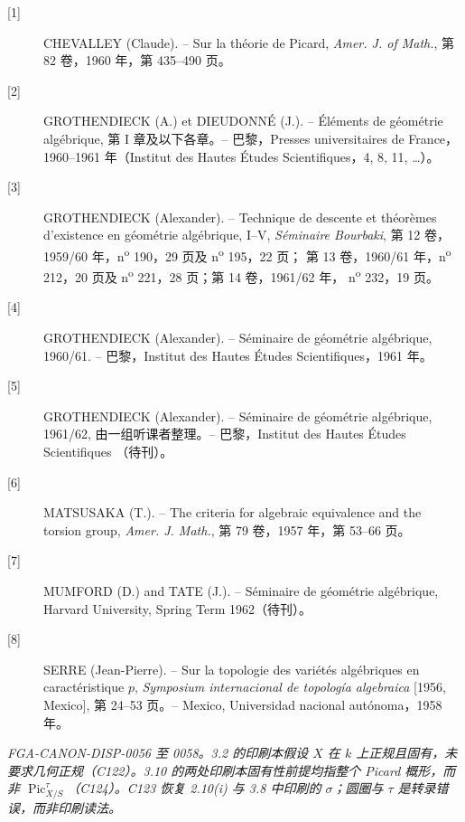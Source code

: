 \documentclass[12pt,twoside,openany]{book}
\numberwithin{equation}{section}
\theoremstyle{plain}
\theoremstyle{definition}
\theoremstyle{remark}
\begin{document}
\begin{description}
\item[{[1]}] CHEVALLEY (Claude). -- Sur la théorie de Picard,
\emph{Amer. J. of Math.}, 第 82 卷，1960 年，第 435--490 页。

\item[{[2]}] GROTHENDIECK (A.) et DIEUDONNÉ (J.). -- Éléments de géométrie
algébrique, 第 I 章及以下各章。-- 巴黎，Presses universitaires de France，
1960--1961 年（Institut des Hautes Études Scientifiques，4, 8, 11,
\ldots）。

\item[{[3]}] GROTHENDIECK (Alexander). -- Technique de descente et théorèmes
d'existence en géométrie algébrique, I--V, \emph{Séminaire Bourbaki}, 第 12 卷，
1959/60 年，n\textsuperscript{o} 190，29 页及 n\textsuperscript{o} 195，22 页；
第 13 卷，1960/61 年，n\textsuperscript{o} 212，20 页及
n\textsuperscript{o} 221，28 页；第 14 卷，1961/62 年，
n\textsuperscript{o} 232，19 页。

\item[{[4]}] GROTHENDIECK (Alexander). -- Séminaire de géométrie algébrique,
1960/61. -- 巴黎，Institut des Hautes Études Scientifiques，1961 年。

\item[{[5]}] GROTHENDIECK (Alexander). -- Séminaire de géométrie algébrique,
1961/62, 由一组听课者整理。-- 巴黎，Institut des Hautes Études Scientifiques
（待刊）。

\item[{[6]}] MATSUSAKA (T.). -- The criteria for algebraic equivalence and the
torsion group, \emph{Amer. J. Math.}, 第 79 卷，1957 年，第 53--66 页。

\item[{[7]}] MUMFORD (D.) and TATE (J.). -- Séminaire de géométrie algébrique,
Harvard University, Spring Term 1962（待刊）。

\item[{[8]}] SERRE (Jean-Pierre). -- Sur la topologie des variétés algébriques
en caractéristique $p$, \emph{Symposium internacional de topología algebraica}
[1956, Mexico], 第 24--53 页。-- Mexico, Universidad nacional autónoma，1958 年。
\end{description}

\par\smallskip
\begingroup\footnotesize
\noindent\textit{FGA-CANON-DISP-0056 至 0058。3.2 的印刷本假设 $X$ 在 $k$ 上正规且固有，未要求几何正规（C122）。3.10 的两处印刷本固有性前提均指整个 Picard 概形，而非 $\operatorname{Pic}_{X/S}^{\tau}$（C124）。C123 恢复 2.10(i) 与 3.8 中印刷的 $\sigma$；圆圈与 $\tau$ 是转录错误，而非印刷读法。}\par
\endgroup
\end{document}
